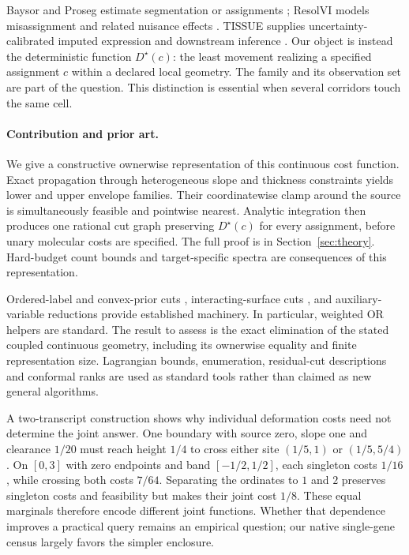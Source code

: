 \documentclass[10pt,letterpaper]{article}
\begin{document}
Baysor and Proseg estimate segmentation or assignments \cite{baysor,proseg}; ResolVI models misassignment and related nuisance effects \cite{resolvi}. TISSUE supplies uncertainty-calibrated imputed expression and downstream inference \cite{tissue}. Our object is instead the deterministic function $D^\star(c)$: the least movement realizing a specified assignment $c$ within a declared local geometry. The family and its observation set are part of the question. This distinction is essential when several corridors touch the same cell.

\paragraph{Contribution and prior art.}
We give a constructive ownerwise representation of this continuous cost function. Exact propagation through heterogeneous slope and thickness constraints yields lower and upper envelope families. Their coordinatewise clamp around the source is simultaneously feasible and pointwise nearest. Analytic integration then produces one rational cut graph preserving $D^\star(c)$ for every assignment, before unary molecular costs are specified. The full proof is in Section~\ref{sec:theory}. Hard-budget count bounds and target-specific spectra are consequences of this representation.

Ordered-label and convex-prior cuts \cite{ishikawa,hochbaum}, interacting-surface cuts \cite{li,shah}, and auxiliary-variable reductions \cite{kolmogorov,kohli} provide established machinery. In particular, weighted OR helpers are standard. The result to assess is the exact elimination of the stated coupled continuous geometry, including its ownerwise equality and finite representation size. Lagrangian bounds, enumeration, residual-cut descriptions and conformal ranks are used as standard tools rather than claimed as new general algorithms.

A two-transcript construction shows why individual deformation costs need not determine the joint answer. One boundary with source zero, slope one and clearance $1/20$ must reach height $1/4$ to cross either site $(1/5,1)$ or $(1/5,5/4)$. On $[0,3]$ with zero endpoints and band $[-1/2,1/2]$, each singleton costs $1/16$, while crossing both costs $7/64$. Separating the ordinates to $1$ and $2$ preserves singleton costs and feasibility but makes their joint cost $1/8$. These equal marginals therefore encode different joint functions. Whether that dependence improves a practical query remains an empirical question; our native single-gene census largely favors the simpler enclosure.
\end{document}

